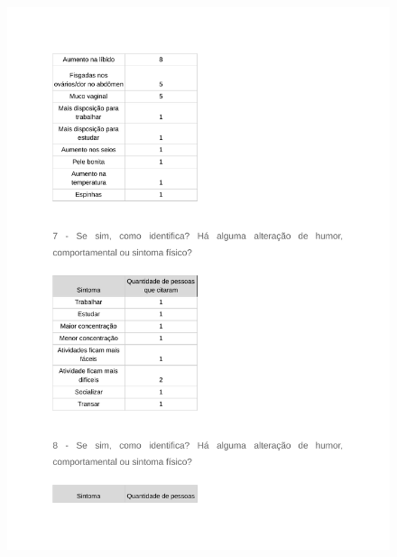 \begin{apendicesenv}
        \begin{figure}[ht]
            \centering
            \includegraphics[keepaspectratio=true,scale=0.7]{figuras/Tab20.pdf}
        \end{figure}
        

\end{apendicesenv}
